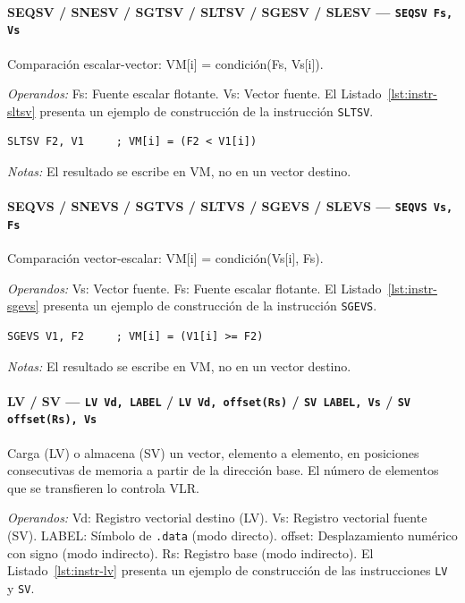 \documentclass[../main.tex]{subfiles}
\begin{document}
\paragraph*{SEQSV / SNESV / SGTSV / SLTSV / SGESV / SLESV --- \texttt{SEQSV Fs, Vs}}
Comparación escalar-vector: VM[i] = condición(Fs, Vs[i]).

\textit{Operandos:} Fs: Fuente escalar flotante. Vs: Vector fuente.
El Listado~\ref{lst:instr-sltsv} presenta un ejemplo de construcción de la instrucción \texttt{SLTSV}.

\begin{lstlisting}[caption={SLTSV},label={lst:instr-sltsv}]
	SLTSV F2, V1     ; VM[i] = (F2 < V1[i])
\end{lstlisting}
\textit{Notas:} El resultado se escribe en VM, no en un vector destino.

\paragraph*{SEQVS / SNEVS / SGTVS / SLTVS / SGEVS / SLEVS --- \texttt{SEQVS Vs, Fs}}
Comparación vector-escalar: VM[i] = condición(Vs[i], Fs).

\textit{Operandos:} Vs: Vector fuente. Fs: Fuente escalar flotante.
El Listado~\ref{lst:instr-sgevs} presenta un ejemplo de construcción de la instrucción \texttt{SGEVS}.

\begin{lstlisting}[caption={SGEVS},label={lst:instr-sgevs}]
	SGEVS V1, F2     ; VM[i] = (V1[i] >= F2)
\end{lstlisting}
\textit{Notas:} El resultado se escribe en VM, no en un vector destino.

\paragraph*{LV / SV --- \texttt{LV Vd, LABEL} / \texttt{LV Vd, offset(Rs)} / \texttt{SV LABEL, Vs} / \texttt{SV offset(Rs), Vs}}
Carga (LV) o almacena (SV) un vector, elemento a elemento, en posiciones consecutivas de memoria a partir de la dirección base. El número de elementos que se transfieren lo controla VLR.

\textit{Operandos:} Vd: Registro vectorial destino (LV). Vs: Registro vectorial fuente (SV). LABEL: Símbolo de \texttt{.data} (modo directo). offset: Desplazamiento numérico con signo (modo indirecto). Rs: Registro base (modo indirecto).
El Listado~\ref{lst:instr-lv} presenta un ejemplo de construcción de las instrucciones \texttt{LV} y \texttt{SV}.
\end{document}
